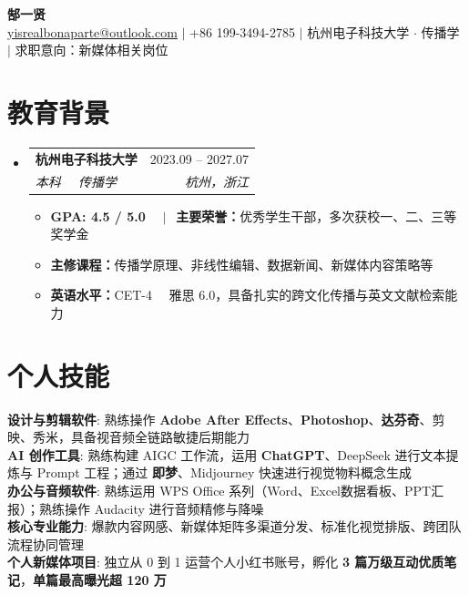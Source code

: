 \documentclass[a4paper,11pt]{article}
\makeatletter
\newcommand{\resumeItem}[1]{
  \item\small{{#1 \vspace{-1pt}}}
}
\newcommand{\resumeEducationHeading}[4]{
  \vspace{-2pt}\item
    \begin{tabular*}{0.97\textwidth}[t]{l@{\extracolsep{\fill}}r}
      \textbf{#1} & #2 \\
      \textit{\small #3} & \textit{\small #4} \\
    \end{tabular*}\vspace{-5pt}
}
\newcommand{\resumeSubHeadingListStart}{\begin{itemize}[leftmargin=0.15in, label={}]}
\newcommand{\resumeSubHeadingListEnd}{\end{itemize}}
\newcommand{\resumeItemListStart}{\begin{itemize}[leftmargin=*, label={\small\textbullet}]}
\newcommand{\resumeItemListEnd}{\end{itemize}\vspace{-2pt}}
\makeatother
\begin{document}
\begin{center}
    \textbf{\Huge { 郜一贤}} \\ \vspace{8pt}
    \small
    \href{mailto:yisrealbonaparte@outlook.com}{\underline{yisrealbonaparte@outlook.com}} $|$
    +86 199-3494-2785 $|$
    杭州电子科技大学 $\cdot$ 传播学 $|$
    求职意向：新媒体相关岗位
\end{center}

\section{教育背景}
  \resumeSubHeadingListStart
    \resumeEducationHeading
      {杭州电子科技大学}{2023.09 -- 2027.07}
      {本科 \ \textbar \ 传播学}{杭州，浙江}
      \resumeItemListStart
        \resumeItem{\textbf{GPA: 4.5 / 5.0} \ \ $|\ \ $ \textbf{主要荣誉：}优秀学生干部，多次获校一、二、三等奖学金}
        \resumeItem{\textbf{主修课程：}传播学原理、非线性编辑、数据新闻、新媒体内容策略等}
        \resumeItem{\textbf{英语水平：}CET-4 \ \textbar \ 雅思 6.0，具备扎实的跨文化传播与英文文献检索能力}
      \resumeItemListEnd
  \resumeSubHeadingListEnd

\section{个人技能}
 \begin{itemize}[leftmargin=0.15in, label={}]
    \small{\item{
     \textbf{设计与剪辑软件}{: 熟练操作 \textbf{Adobe After Effects}、\textbf{Photoshop}、\textbf{达芬奇}、剪映、秀米，具备视音频全链路敏捷后期能力} \\
     \textbf{AI 创作工具}{: 熟练构建 AIGC 工作流，运用 \textbf{ChatGPT}、DeepSeek 进行文本提炼与 Prompt 工程；通过 \textbf{即梦}、Midjourney 快速进行视觉物料概念生成} \\
     \textbf{办公与音频软件}{: 熟练运用 WPS Office 系列（Word、Excel数据看板、PPT汇报）；熟练操作 Audacity 进行音频精修与降噪} \\
     \textbf{核心专业能力}{: 爆款内容网感、新媒体矩阵多渠道分发、标准化视觉排版、跨团队流程协同管理} \\
     \textbf{个人新媒体项目}{: 独立从 0 到 1 运营个人小红书账号，孵化 \textbf{3 篇万级互动优质笔记}，\textbf{单篇最高曝光超 120 万}}
    }}
 \end{itemize}
\end{document}
